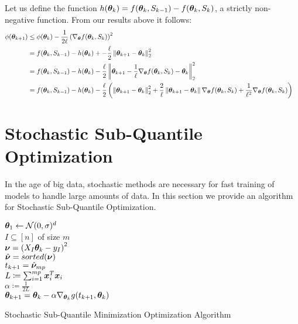\documentclass{article} %
\newcommand{\norm}[1]{\left\lVert#1\right\rVert}
\begin{document}
\begin{appendices}
	\bigskip
	Let us define the function $h({\bm{\theta}}_k) = f({\bm{\theta}}_k,S_{k-1}) - f({\bm{\theta}}_k,S_k)$, a strictly non-negative function. From our results above it follows:
	\begin{align*}
		\phi(\vtheta_{k+1}) &\leq \phi(\vtheta_k) - \frac{1}{2\ell}\left(\nabla_\vtheta f(\vtheta_k,S_k)\right)^2 &&\\
		&= f(\vtheta_k, S_{k-1}) - h(\vtheta_k) +  - \frac{\ell}{2}\norm{\vtheta_{k+1} - \vtheta_k}^2_2 \\
		&= f(\vtheta_k, S_{k-1}) - h(\vtheta_k) - \frac{\ell}{2}\norm{\vtheta_{k+1} - \frac{1}{\ell} \nabla_\vtheta f(\vtheta_k,S_k) - \vtheta_k}_2^2 &&\\
		&= f(\vtheta_k, S_{k-1}) - h(\vtheta_k) - \frac{\ell}{2}\left(\norm{\vtheta_{k+1}-\vtheta_k}_2^2 + \frac{2}{\ell}\norm{\vtheta_{k+1}-\vtheta_k}\nabla_\vtheta f(\vtheta_k,S_k) + \frac{1}{\ell^2}\nabla_\vtheta f(\vtheta_k,S_k)\right)
	\end{align*}
	\newpage
	
	\section{Stochastic Sub-Quantile Optimization}
	In the age of big data, stochastic methods are necessary for fast training of models to handle large amounts of data. In this section we provide an algorithm for Stochastic Sub-Quantile Optimization.
	\begin{algorithm}[H]
		\DontPrintSemicolon
		
		${\bm{\theta}}_1 \gets \mathcal{N}(0,\sigma)^d$\\
		{
			$I \subseteq \left[n\right]$ of size $m$\\
			$\displaystyle {\bm{\nu}} = \left(X_I{\bm{\theta}}_k - y_I\right)^2$\\
			$\hat{{\bm{\nu}}} = sorted({\bm{\nu}})$\\
			$\displaystyle t_{k+1} = \hat{{\bm{\nu}}}_{mp}$\\
			$L \coloneqq \sum_{i=1}^{mp} {\bm{x}}_i^T{\bm{x}}_i$\\
			$\alpha \coloneqq \frac{1}{2L}$\\
			$\displaystyle {\bm{\theta}}_{k+1} = {\bm{\theta}}_k - \alpha \nabla_{{\bm{\theta}}_k}g(t_{k+1},{\bm{\theta}}_k)$
		}
		\caption{Stochastic Sub-Quantile Minimization Optimization Algorithm}
		\label{alg:sqo-stochastic}
	\end{algorithm}
	

\end{appendices}
\end{document}
